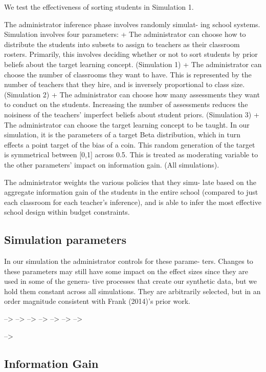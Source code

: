 \documentclass[10pt, letterpaper]{article}
\begin{document}
We test the effectiveness of sorting students in Simulation 1.

The administrator inference phase involves randomly simulat- ing school
systems. Simulation involves four parameters: + The administrator can
choose how to distribute the students into subsets to assign to teachers
as their classroom rosters. Primarily, this involves deciding whether or
not to sort students by prior beliefs about the target learning concept.
(Simulation 1) + The administrator can choose the number of classrooms
they want to have. This is represented by the number of teachers that
they hire, and is inversely proportional to class size. (Simulation 2) +
The administrator can choose how many assessments they want to conduct
on the students. Increasing the number of assessments reduces the
noisiness of the teachers' imperfect beliefs about student priors.
(Simulation 3) + The administrator can choose the target learning
concept to be taught. In our simulation, it is the parameters of a
target Beta distribution, which in turn effects a point target of the
bias of a coin. This random generation of the target is symmetrical
between {[}0,1{]} across 0.5. This is treated as moderating variable to
the other parameters' impact on information gain. (All simulations).

The administrator weights the various policies that they simu- late
based on the aggregate information gain of the students in the entire
school (compared to just each classroom for each teacher's inference),
and is able to infer the most effective school design within budget
constraints.

\subsection{Simulation parameters}\label{simulation-parameters}

In our simulation the administrator controls for these parame- ters.
Changes to these parameters may still have some impact on the effect
sizes since they are used in some of the genera- tive processes that
create our synthetic data, but we hold them constant across all
simulations. They are arbitrarily selected, but in an order magnitude
consistent with Frank (2014)'s prior work.

--\textgreater{} --\textgreater{} --\textgreater{} --\textgreater{}
--\textgreater{} --\textgreater{} --\textgreater{}

--\textgreater{}

\subsection{Information Gain}\label{information-gain}
\end{document}
